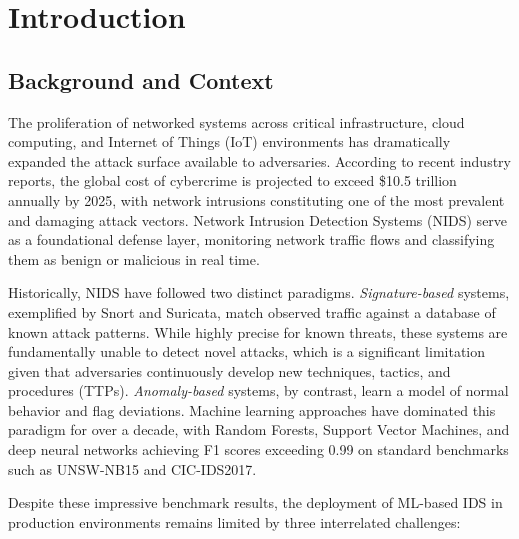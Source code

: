 \documentclass[12pt, letterpaper, oneside]{report}
\begin{document}
\chapter{Introduction}
\label{ch:introduction}

\section{Background and Context}
\label{sec:background}

The proliferation of networked systems across critical infrastructure, cloud computing, and Internet of Things (IoT) environments has dramatically expanded the attack surface available to adversaries. According to recent industry reports, the global cost of cybercrime is projected to exceed \$10.5 trillion annually by 2025, with network intrusions constituting one of the most prevalent and damaging attack vectors. Network Intrusion Detection Systems (NIDS) serve as a foundational defense layer, monitoring network traffic flows and classifying them as benign or malicious in real time.

Historically, NIDS have followed two distinct paradigms. \emph{Signature-based} systems, exemplified by Snort and Suricata, match observed traffic against a database of known attack patterns. While highly precise for known threats, these systems are fundamentally unable to detect novel attacks, which is a significant limitation given that adversaries continuously develop new techniques, tactics, and procedures (TTPs). \emph{Anomaly-based} systems, by contrast, learn a model of normal behavior and flag deviations. Machine learning approaches have dominated this paradigm for over a decade, with Random Forests, Support Vector Machines, and deep neural networks achieving F1 scores exceeding 0.99 on standard benchmarks such as UNSW-NB15 and CIC-IDS2017.

Despite these impressive benchmark results, the deployment of ML-based IDS in production environments remains limited by three interrelated challenges:
\end{document}
